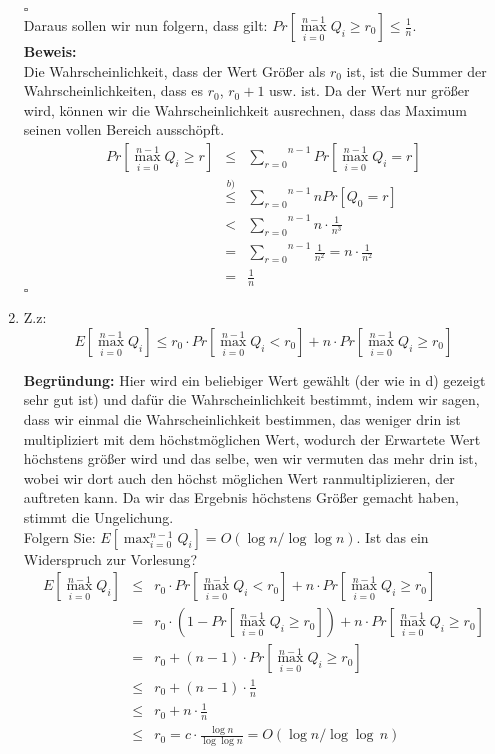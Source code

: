 \documentclass[11pt,a4paper,ngerman]{article}
\begin{document}
\begin{enumerate}[\bfseries a)]
\mbox{}\hfill $\square$\\

Daraus sollen wir nun folgern, dass gilt: $Pr[\underset{i=0}{\overset{n-1}{\max}} Q_i \geq r_0] \leq \frac{1}{n}$.\\

\textbf{Beweis:}\\

Die Wahrscheinlichkeit, dass der Wert Größer als $r_0$ ist, ist die Summer der Wahrscheinlichkeiten, dass es $r_0$, $r_0 + 1$ usw. ist. Da der Wert nur größer wird, können wir die Wahrscheinlichkeit ausrechnen, dass das Maximum seinen vollen Bereich ausschöpft.\\

$$
\begin{array}{rcl}
Pr[\overset{n-1}{\underset{i=0}{\max}} Q_i \geq r] &\leq& \overset{n-1}{\underset{r=0}{\sum}} Pr[\overset{n-1}{\underset{i=0}{\max}} Q_i = r]\\
&\stackrel{b)}{\leq}& \overset{n-1}{\underset{r=0}{\sum}} n Pr[Q_0 = r]\\
& < & \overset{n-1}{\underset{r=0}{\sum}} n \cdot \frac{1}{n^3}\\
& = & \overset{n-1}{\underset{r=0}{\sum}} \frac{1}{n^2} = n \cdot \frac{1}{n^2}\\
&=& \frac{1}{n}
\end{array}
$$
\mbox{}\hfill $\square$

\item Z.z: 
$$ E[\max_{i=0}^{n-1} Q_i] \leq r_0 \cdot Pr[\max_{i=0}^{n-1} Q_i < r_0] + n \cdot Pr[\max_{i=0}^{n-1} Q_i \geq r_0] $$

\textbf{Begründung:} Hier wird ein beliebiger Wert gewählt (der wie in d) gezeigt sehr gut ist) und dafür die Wahrscheinlichkeit bestimmt, indem wir sagen, dass wir einmal die Wahrscheinlichkeit bestimmen, das weniger drin ist multipliziert mit dem höchstmöglichen Wert, wodurch der Erwartete Wert höchstens größer wird und das selbe, wen wir vermuten das mehr drin ist, wobei wir dort auch den höchst möglichen Wert ranmultiplizieren, der auftreten kann. Da wir das Ergebnis höchstens Größer gemacht haben, stimmt die Ungelichung.\\

Folgern Sie: $E[\max_{i=0}^{n-1} Q_i] = O(\log n / \log \log n)$. Ist das ein Widerspruch zur Vorlesung?\\

$$
\begin{array}{rcl}
E[\max_{i=0}^{n-1} Q_i] &\leq&  r_0 \cdot Pr[\max_{i=0}^{n-1} Q_i < r_0] + n \cdot Pr[\max_{i=0}^{n-1} Q_i \geq r_0]\\
&=&  r_0 \cdot (1 - Pr[\max_{i=0}^{n-1} Q_i \geq r_0]) + n \cdot Pr[\max_{i=0}^{n-1} Q_i \geq r_0]\\
&=& r_0 + (n-1) \cdot  Pr[\max_{i=0}^{n-1} Q_i \geq r_0]\\
&\leq& r_0 + (n-1) \cdot \frac{1}{n}\\
&\leq& r_0 + n \cdot \frac{1}{n}\\
&\leq& r_0 = c \cdot \frac{\log n}{\log \log n} = O (\log n / \log \log \,n )
\end{array}
$$


\end{enumerate}
\end{document}
